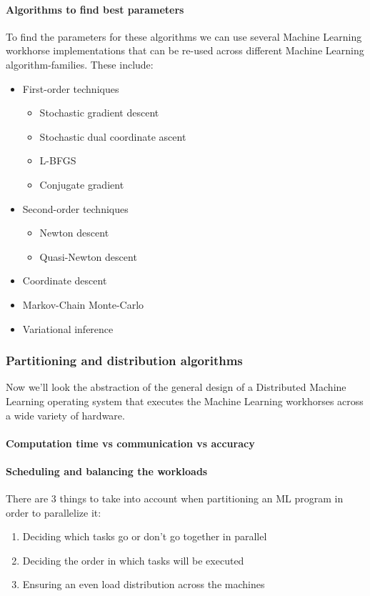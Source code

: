 \paragraph{Algorithms to find best parameters}
To find the parameters for these algorithms we can use several Machine Learning workhorse implementations that can be re-used across different Machine Learning algorithm-families. These include:
\begin{itemize}
	\item First-order techniques
	\begin{itemize}
		\item Stochastic gradient descent
		\item Stochastic dual coordinate ascent\cite{Shal13}
		\item L-BFGS
		\item Conjugate gradient
	\end{itemize}
	\item Second-order techniques
	\begin{itemize}
		\item Newton descent
		\item Quasi-Newton descent
	\end{itemize}
	\item Coordinate descent
	\item Markov-Chain Monte-Carlo
	\item Variational inference
\end{itemize}




\subsubsection{Partitioning and distribution algorithms}
Now we'll look the abstraction of the general design of a Distributed Machine Learning operating system that executes the Machine Learning workhorses across a wide variety of hardware.


\paragraph{Computation time vs communication vs accuracy}


\paragraph{Scheduling and balancing the workloads}
There are 3 things to take into account when partitioning an ML program in order to parallelize it:\cite{Xing16}\\
\begin{enumerate}
	\item Deciding which tasks go or don't go together in parallel
	\item Deciding the order in which tasks will be executed
	\item Ensuring an even load distribution across the machines
\end{enumerate}


